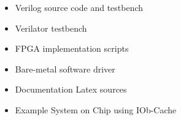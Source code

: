 \begin{itemize}                                            
  \itemsep-0.5em
\item Verilog source code and testbench
\item Verilator testbench
\item FPGA implementation scripts
\item Bare-metal software driver                                                   
\item Documentation Latex sources
\item Example System on Chip using IOb-Cache
\end{itemize}   
